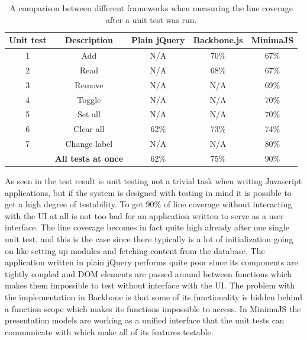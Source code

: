 \begin{table}[H]
	\begin{center}
		\begin{tabular}{ c | c | c | c | c}
			\hline
			\textbf{Unit test}	& \textbf{Description}			& \textbf{Plain jQuery}	& \textbf{Backbone.js} & \textbf{MinimaJS} \\ \hline
			1 					& Add							& N/A				& 70\%				& 67\%			\\
			2					& Read							& N/A				& 68\%				& 67\%			\\
			3					& Remove						& N/A				& N/A				& 69\%			\\
			4					& Toggle						& N/A				& N/A				& 70\%			\\
			5					& Set all						& N/A				& N/A				& 70\%			\\
			6					& Clear all						& 62\%				& 73\%				& 74\%			\\
			7					& Change label					& N/A				& N/A				& 80\%			\\ \hline
								& \textbf{All tests at once}	& 62\%				& 75\%				& 90\%			
		\end{tabular}
		\caption{A comparison between different frameworks when measuring the line coverage after a unit test was run.}
		\label{table:unit_tests_comparasion}
	\end{center}
\end{table}

As seen in the test result is unit testing not a trivial task when writing Javascript applications, but if the system is designed with testing in mind it is possible to get a high degree of testability. To get 90\% of line coverage without interacting with the UI at all is not too bad for an application written to serve as a user interface. The line coverage becomes in fact quite high already after one single unit test, and this is the case since there typically is a lot of initialization going on like setting up modules and fetching content from the database. The application written in plain jQuery performs quite poor since its components are tightly coupled and DOM elements are passed around between functions which makes them impossible to test without interface with the UI. The problem with the implementation in Backbone is that some of its functionality is hidden behind a function scope which makes its functions impossible to access. In MinimaJS the presentation models are working as a unified interface that the unit tests can communicate with which make all of its features testable.

